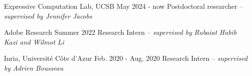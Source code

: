 

\begin{cventries}


  \cventry
  {Expressive Computation Lab, UCSB} %
  {May 2024 - now} %
  {
    Postdoctoral researcher -- \textit{supervised by Jennifer Jacobs}
  }

  \cventry
    {Adobe Research} %
    {Summer 2022} %
    {
      Research Intern -- \textit{supervised by Rubaiat Habib Kazi and Wilmot Li}
    }

  \cventry
    {Inria, Université Côte d'Azur} %
    {Feb. 2020 - Aug. 2020} %
    {Research Intern -- \textit{supervised by Adrien Bousseau}} %



\end{cventries}
